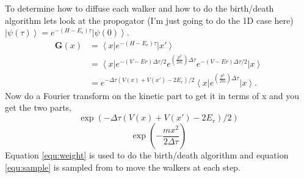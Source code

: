 To determine how to diffuse each walker and how to do the birth/death algorithm lets look at the propogator (I'm just going to do the 1D case here) $\left| \psi(\tau) \right> = e^{-(H-E_r)\tau} \left| \psi(0) \right>$.
\begin{equation}
  \begin{split}
    \mathbf{G}(x) &= \left<x\right| e^{-(H-E_r)\tau} \left|x'\right>\\
    &= \left<x\right| e^{-(V-Er)\Delta\tau/2} e^{(\frac{p^2}{2m})\Delta\tau} e^{-(V-Er)\Delta\tau/2} \left|x\right>\\
    &= e^{-\Delta\tau\left(V(x)+V(x')-2E_r\right)/2} \left<x\right| e^{(\frac{p^2}{2m})\Delta\tau} \left|x\right>.
  \end{split}
\end{equation}
Now do a Fourier transform on the kinetic part to get it in terms of x and you get the two parts,
\begin{equation}
  \exp{(-\Delta\tau\left(V(x)+V(x')-2E_r\right)/2)}
  \label{equ:weight}
\end{equation}
\begin{equation}
  \exp{(-\frac{mx^2}{2\Delta\tau})}
  \label{equ:sample}
\end{equation}
Equation \ref{equ:weight} is used to do the birth/death algorithm and equation \ref{equ:sample} is sampled from to move the walkers at each step.

